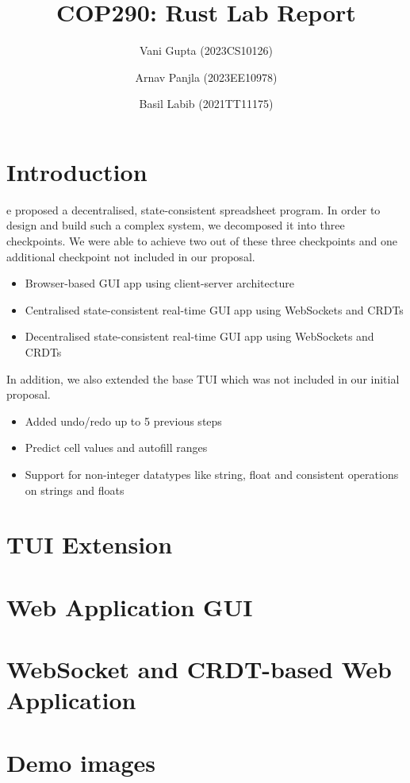 \documentclass[9pt,a4paper,twocolumn,twoside]{tau-class/tau}
\title{COP290: Rust Lab Report}
\author[a]{Vani Gupta (2023CS10126)}
\author[a]{Arnav Panjla (2023EE10978)}
\author[a]{Basil Labib (2021TT11175)}
\affil[a]{Indian Institute of Technology, Delhi}
\newcommand{\cmark}{\ding{51}}%
\newcommand{\xmark}{\ding{55}}%
\begin{document}
		
    \maketitle 
    \thispagestyle{firststyle} 
    \tauabstract 
    

\section{Introduction}

    e proposed a decentralised, state-consistent spreadsheet program. In order to design and build such a complex system, we decomposed it into three checkpoints. We were able to achieve two out of these three checkpoints and one additional checkpoint not included in our proposal. 

    \begin{itemize}
        \item \cmark Browser-based GUI app using client-server architecture
        \item \cmark Centralised state-consistent real-time GUI app using WebSockets and CRDTs
        \item \xmark Decentralised state-consistent real-time GUI app using WebSockets and CRDTs
    \end{itemize}

    In addition, we also extended the base TUI which was not included in our initial proposal.

    \begin{itemize}
        \item \cmark Added undo/redo up to 5 previous steps
        \item \cmark Predict cell values and autofill ranges
        \item \cmark Support for non-integer datatypes like string, float and consistent operations on strings and floats
    \end{itemize}

\section{TUI Extension}

    
	
\section{Web Application GUI}

    
    
\section{WebSocket and CRDT-based Web Application}

    

\section{Demo images}

    

\printbibliography
\end{document}

